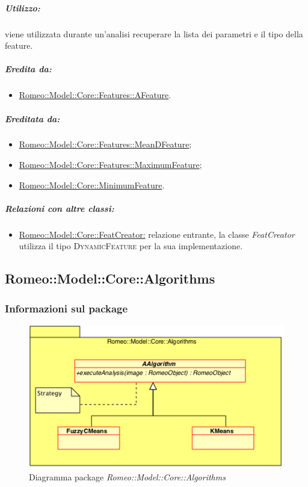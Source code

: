			\subparagraph{Utilizzo:} viene utilizzata durante un’analisi recuperare la lista dei parametri e il tipo della feature\g{}.
			
			\subparagraph{Eredita da:}
				\begin{itemize}
					\item \hyperref[features::features]{Romeo::Model::Core::Features::AFeature}.
				\end{itemize}
				
			\subparagraph{Ereditata da:}
				\begin{itemize}
					\item \hyperref[]{Romeo::Model::Core::Features::MeanDFeature};
					\item \hyperref[]{Romeo::Model::Core::Features::MaximumFeature};
					\item \hyperref[]{Romeo::Model::Core::MinimumFeature}.
				\end{itemize}
				
			\subparagraph{Relazioni con altre classi:}
				\begin{itemize}
					\item \hyperref[]{Romeo::Model::Core::FeatCreator:} relazione entrante, la classe \textsl{FeatCreator} utilizza il tipo \textsc{DynamicFeature} per la sua implementazione. 
				\end{itemize}
			
			
	\pagebreak

	\subsection{Romeo::Model::Core::Algorithms}
	\label{romeo::model::core::algorithms}
	
		\subsubsection{Informazioni sul package}
		\begin{figure}[!h]
			\centering
			\includegraphics[width=0.9\linewidth]{./Content/Immagini/Romeo__Model__Core__Adapters__Algorithms.png}
			\caption{Diagramma package \textsl{Romeo::Model::Core::Algorithms}}
		\end{figure}		
		

